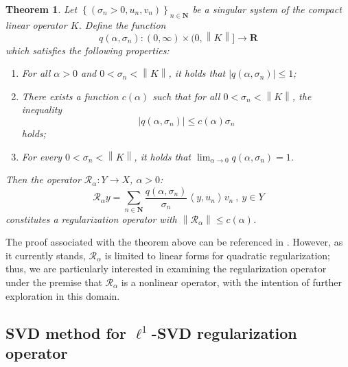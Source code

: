 \documentclass[a4paper,12pt]{article}
\newtheorem{theorem}{Theorem}[section]
\numberwithin{equation}{section}
\begin{document}
\begin{theorem}\label{the3.1}
    Let $\left\{\left(\sigma_{n}>0, u_{n}, v_{n}\right)\right\}_{n\in\mathbf{N}}$ be a singular system of the compact linear operator $K$. Define the function
    \begin{equation*}
        q\left(\alpha,\sigma_{n}\right): \left(0,\infty\right)\times(0,\left\|K\right\|]\rightarrow \mathbf{R}
    \end{equation*}
    which satisfies the following properties:
    \begin{enumerate}
    \item For all $\alpha>0$ and $0<\sigma_{n}<\left\|K\right\|$, it holds that $\left|q\left(\alpha,\sigma_{n}\right)\right|\leq 1$;
    \item There exists a function $c\left(\alpha\right)$ such that for all $0<\sigma_ {n}<\left\|K\right\|$, the inequality 
        \begin{equation*}
            \left|q\left(\alpha,\sigma_{n}\right)\right|\leq c\left(\alpha\right)\sigma_{n}
        \end{equation*} 
        holds;
    \item For every $0<\sigma_{n}<\left\|K\right\|$, it holds that $\lim_{\alpha\rightarrow 0}q\left(\alpha,\sigma_{n}\right)=1$.
    \end{enumerate}
    Then the operator $\mathcal{R}_{\alpha}:Y\rightarrow X$, $\alpha>0$:
    \begin{equation}\label{equ3.1}
        \mathcal{R}_{\alpha}y=\sum_{n\in\mathbf{N}}\frac{q\left(\alpha,\sigma_{n}\right)} {\sigma_{n}}\left<y,u_{n}\right>v_{n}\ ,\ y\in Y
    \end{equation}
    constitutes a regularization operator with $\left\|\mathcal{R}_{\alpha}\right\|\leq c\left(\alpha\right)$.
\end{theorem}

\par The proof associated with the theorem above can be referenced in \cite[Theorem 2.6]{K1996}. However, as it currently stands, $\mathcal{R}_{\alpha}$ is limited to linear forms for quadratic regularization; thus, we are particularly interested in examining the regularization operator under the premise that $\mathcal{R}_{\alpha}$ is a nonlinear operator, with the intention of further exploration in this domain.

\subsection{SVD method for $\ell^{1}$-SVD regularization operator}\label{sec3.1}
\end{document}
